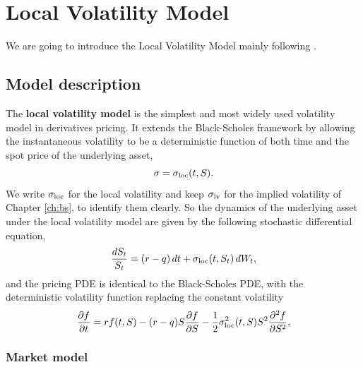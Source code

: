
\chapter{Local Volatility Model}\label{ch:local_vol}

We are going to introduce the Local Volatility Model mainly following \cite[Ch. 2]{bergomi_stochastic_vol}.

\section{Model description}

The \textbf{local volatility model} is the simplest and most widely used volatility model in derivatives pricing.
It extends the Black-Scholes framework by allowing the instantaneous volatility to be a deterministic function of both time and the spot price of the underlying asset,
\begin{equation*}
    \sigma = \sigma_{\mathrm{loc}}(t, S).
\end{equation*}
We write $\sigma_{\mathrm{loc}}$ for the local volatility and keep $\sigma_{\mathrm{iv}}$ for the implied volatility of Chapter \ref{ch:bs},
to identify them clearly.
So the dynamics of the underlying asset under the local volatility model are given by the following stochastic differential equation,
\begin{equation*}
    \frac{dS_t}{S_t} = (r - q)\, dt + \sigma_{\mathrm{loc}}(t, S_t)\, dW_t,
\end{equation*}
and the pricing PDE is identical to the Black-Scholes PDE,
with the deterministic volatility function replacing the constant volatility
\begin{equation*}
    \frac{\partial f}{\partial t} =
        r f(t, S)
        - (r - q) S \frac{\partial f}{\partial S}
        - \frac{1}{2} \sigma_{\mathrm{loc}}^2(t, S) S^2 \frac{\partial^2 f}{\partial S^2},
\end{equation*}

\subsection{Market model}

